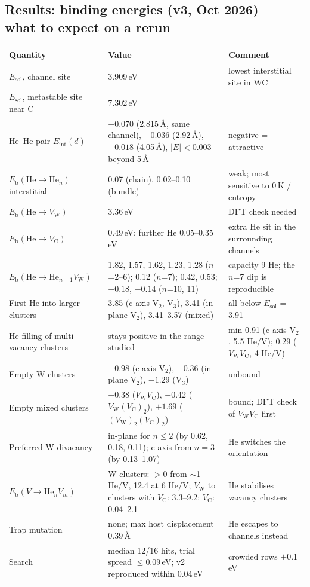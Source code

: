 \documentclass[10pt]{article}
\newcommand{\Eb}{E_\mathrm{b}}
\newcommand{\He}{\mathrm{He}}
\begin{document}
\subsection*{Results: binding energies (v3, Oct 2026) -- what to expect on a rerun}
\begin{xltabular}{\linewidth}{L{5.2cm} L{6.6cm} Y}
\toprule
\textbf{Quantity} & \textbf{Value} & \textbf{Comment} \\
\midrule\endhead
$E_\mathrm{sol}$, channel site & 3.909\,eV & lowest interstitial site in WC \\
$E_\mathrm{sol}$, metastable site near C & 7.302\,eV & \\
He--He pair $E_\mathrm{int}(d)$ & $-0.070$ (2.815\,\AA, same channel), $-0.036$ (2.92\,\AA), $+0.018$ (4.05\,\AA), $|E|<0.003$ beyond 5\,\AA & negative = attractive \\
$\Eb(\He\to\He_n)$ interstitial & 0.07 (chain), 0.02--0.10 (bundle) & weak; most sensitive to 0\,K / entropy \\
$\Eb(\He\to V_\mathrm{W})$ & 3.36\,eV & DFT check needed \\
$\Eb(\He\to V_\mathrm{C})$ & 0.49\,eV; further He 0.05--0.35\,eV & extra He sit in the surrounding channels \\
$\Eb(\He\to\He_{n-1}V_\mathrm{W})$ & 1.82, 1.57, 1.62, 1.23, 1.28 ($n$=2--6); 0.12 ($n$=7); 0.42, 0.53; $-0.18$, $-0.14$ ($n$=10, 11) & capacity 9 He; the $n$=7 dip is reproducible \\
First He into larger clusters & 3.85 (c-axis V$_2$, V$_3$), 3.41 (in-plane V$_2$), 3.41--3.57 (mixed) & all below $E_\mathrm{sol}$ = 3.91 \\
He filling of multi-vacancy clusters & stays positive in the range studied & min 0.91 (c-axis V$_2$, 5.5 He/V); 0.29 ($V_\mathrm{W}V_\mathrm{C}$, 4 He/V) \\
Empty W clusters & $-0.98$ (c-axis V$_2$), $-0.36$ (in-plane V$_2$), $-1.29$ (V$_3$) & unbound \\
Empty mixed clusters & $+0.38$ ($V_\mathrm{W}V_\mathrm{C}$), $+0.42$ ($V_\mathrm{W}(V_\mathrm{C})_2$), $+1.69$ ($(V_\mathrm{W})_2(V_\mathrm{C})_2$) & bound; DFT check of $V_\mathrm{W}V_\mathrm{C}$ first \\
Preferred W divacancy & in-plane for $n\le2$ (by 0.62, 0.18, 0.11); c-axis from $n=3$ (by 0.13--1.07) & He switches the orientation \\
$\Eb(V\to\He_nV_m)$ & W clusters: $>0$ from $\sim$1 He/V, 12.4 at 6 He/V; $V_\mathrm{W}$ to clusters with $V_\mathrm{C}$: 3.3--9.2; $V_\mathrm{C}$: 0.04--2.1 & He stabilises vacancy clusters \\
Trap mutation & none; max host displacement 0.39\,\AA & He escapes to channels instead \\
Search & median 12/16 hits, trial spread $\le$0.09\,eV; v2 reproduced within 0.04\,eV & crowded rows $\pm$0.1\,eV \\
\bottomrule
\end{xltabular}
\end{document}
